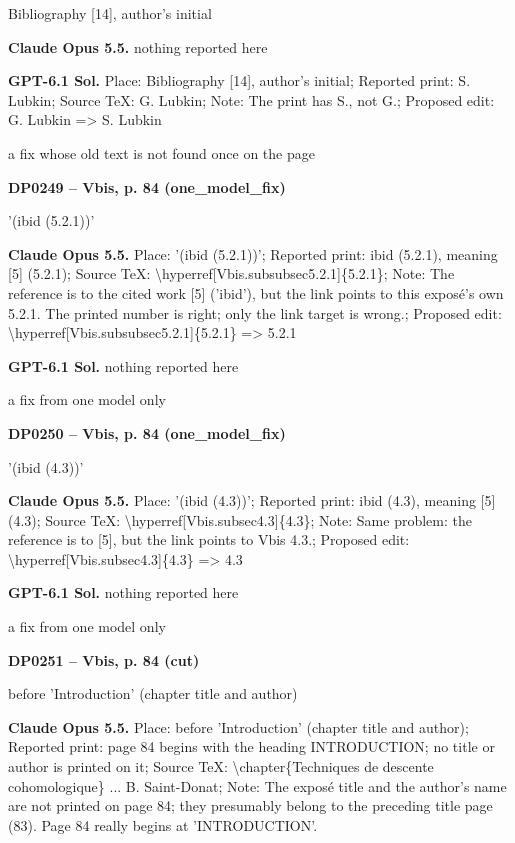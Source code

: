 Bibliography [14], author's initial\par
\textbf{Claude Opus 5.5.} nothing reported here\par
\textbf{GPT-6.1 Sol.} Place: Bibliography [14], author's initial; Reported print: S. Lubkin; Source TeX: G. Lubkin; Note: The print has S., not G.; Proposed edit: G. Lubkin =\allowbreak > S. Lubkin\par
a fix whose old text is not found once on the page\par
\par\noindent\hypertarget{DP0249}{}\textbf{DP0249 -- Vbis, p. 84 (one\_model\_fix)}\par
'(ibid (5.2.1))'\par
\textbf{Claude Opus 5.5.} Place: '(ibid (5.2.1))'; Reported print: ibid (5.2.1), meaning [5] (5.2.1); Source TeX: \textbackslash{}hyperref[Vbis.subsubsec5.2.1]\{5.2.1\}; Note: The reference is to the cited work [5] ('ibid'), but the link points to this exposé's own 5.2.1. The printed number is right; only the link target is wrong.; Proposed edit: \textbackslash{}hyperref[Vbis.subsubsec5.2.1]\{5.2.1\} =\allowbreak > 5.2.1\par
\textbf{GPT-6.1 Sol.} nothing reported here\par
a fix from one model only\par
\par\noindent\hypertarget{DP0250}{}\textbf{DP0250 -- Vbis, p. 84 (one\_model\_fix)}\par
'(ibid (4.3))'\par
\textbf{Claude Opus 5.5.} Place: '(ibid (4.3))'; Reported print: ibid (4.3), meaning [5] (4.3); Source TeX: \textbackslash{}hyperref[Vbis.subsec4.3]\{4.3\}; Note: Same problem: the reference is to [5], but the link points to Vbis 4.3.; Proposed edit: \textbackslash{}hyperref[Vbis.subsec4.3]\{4.3\} =\allowbreak > 4.3\par
\textbf{GPT-6.1 Sol.} nothing reported here\par
a fix from one model only\par
\par\noindent\hypertarget{DP0251}{}\textbf{DP0251 -- Vbis, p. 84 (cut)}\par
before 'Introduction' (chapter title and author)\par
\textbf{Claude Opus 5.5.} Place: before 'Introduction' (chapter title and author); Reported print: page 84 begins with the heading INTRODUCTION; no title or author is printed on it; Source TeX: \textbackslash{}chapter\{Techniques de descente cohomologique\} ... B. Saint-Donat; Note: The exposé title and the author's name are not printed on page 84; they presumably belong to the preceding title page (83). Page 84 really begins at 'INTRODUCTION'.\par
